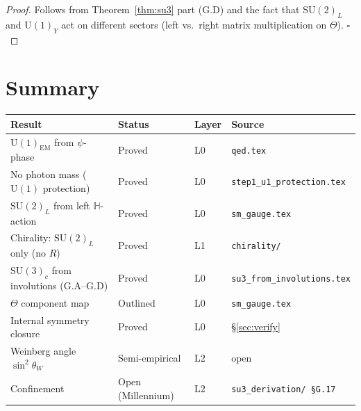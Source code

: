 \documentclass[11pt,a4paper]{article}
\theoremstyle{definition}
\theoremstyle{remark}
\begin{document}
\begin{proof}
Follows from Theorem~\ref{thm:su3} part (G.D) and the fact that
$\mathrm{SU}(2)_L$ and $\mathrm{U}(1)_Y$ act on different sectors
(left vs.\ right matrix multiplication on $\Theta$). $\square$
\end{proof}

\section{Summary}\label{sec:summary_SM}

\begin{center}
\begin{longtable}{llll}
\toprule
Result & Status & Layer & Source \\
\midrule
$\mathrm{U}(1)_{\mathrm{EM}}$ from $\psi$-phase & Proved & L0 &
  \texttt{qed.tex} \\
No photon mass ($\mathrm{U}(1)$ protection) & Proved & L0 &
  \texttt{step1\_u1\_protection.tex} \\
$\mathrm{SU}(2)_L$ from left $\mathbb{H}$-action & Proved & L0 &
  \texttt{sm\_gauge.tex} \\
Chirality: $\mathrm{SU}(2)_L$ only (no $R$) & Proved & L1 &
  \texttt{chirality/} \\
$\mathrm{SU}(3)_c$ from involutions (G.A--G.D) & Proved & L0 &
  \texttt{su3\_from\_involutions.tex} \\
$\Theta$ component map & Outlined & L0 &
  \texttt{sm\_gauge.tex} \\
Internal symmetry closure & Proved & L0 &
  \S\ref{sec:verify} \\
Weinberg angle $\sin^2\theta_W$ & Semi-empirical & L2 & open \\
Confinement & Open (Millennium) & L2 &
  \texttt{su3\_derivation/ \S G.17} \\
\bottomrule
\end{longtable}
\end{center}
\end{document}
